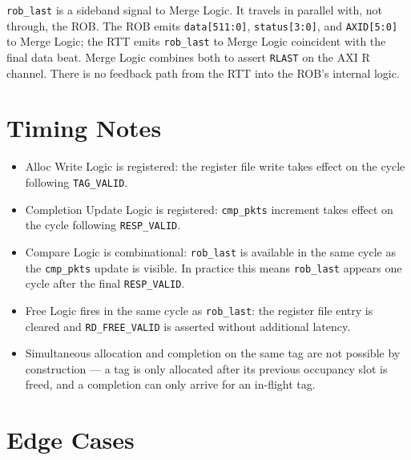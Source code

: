 \documentclass[11pt,a4paper]{article}
\begin{document}
\texttt{rob\_last} is a sideband signal to Merge Logic. It travels in
parallel with, not through, the ROB. The ROB emits
\texttt{data[511:0]}, \texttt{status[3:0]}, and \texttt{AXID[5:0]} to
Merge Logic; the RTT emits \texttt{rob\_last} to Merge Logic
coincident with the final data beat. Merge Logic combines both to
assert \texttt{RLAST} on the AXI R channel. There is no feedback path
from the RTT into the ROB's internal logic.

\section{Timing Notes}

\begin{itemize}
  \item Alloc Write Logic is registered: the register file write takes
        effect on the cycle following \texttt{TAG\_VALID}.
  \item Completion Update Logic is registered: \texttt{cmp\_pkts}
        increment takes effect on the cycle following \texttt{RESP\_VALID}.
  \item Compare Logic is combinational: \texttt{rob\_last} is available
        in the same cycle as the \texttt{cmp\_pkts} update is visible.
        In practice this means \texttt{rob\_last} appears one cycle
        after the final \texttt{RESP\_VALID}.
  \item Free Logic fires in the same cycle as \texttt{rob\_last}:
        the register file entry is cleared and \texttt{RD\_FREE\_VALID}
        is asserted without additional latency.
  \item Simultaneous allocation and completion on the same tag are not
        possible by construction — a tag is only allocated after its
        previous occupancy slot is freed, and a completion can only
        arrive for an in-flight tag.
\end{itemize}

\section{Edge Cases}
\end{document}
